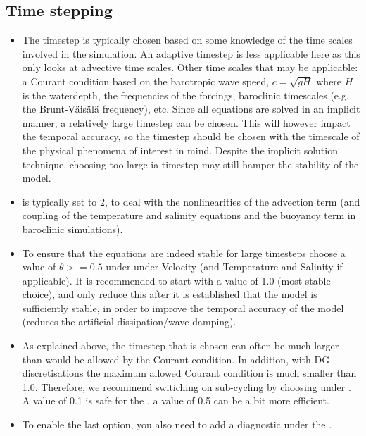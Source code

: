 \subsection{Time stepping}
\begin{itemize}
\item The timestep is typically chosen based on some knowledge of the time scales
  involved in the simulation. An adaptive timestep is less applicable here as
  this only looks at advective time scales. Other time scales that may be
  applicable: a Courant condition based on the barotropic wave speed, $c=\sqrt{gH}$ where
  $H$ is the waterdepth, the frequencies of the forcings, baroclinic timescales
  (e.g. the Brunt-V\"ais\"al\"a frequency), etc. Since all equations are solved in
  an implicit manner, a relatively large timestep can be chosen. This will
  however impact the temporal accuracy, so the timestep should be chosen with
  the timescale of the physical phenomena of interest in mind. Despite the
  implicit solution technique, choosing too large ia timestep may still hamper
  the stability of the model.
\item {} is typically set to 2, to
  deal with the nonlinearities of the advection term (and coupling of the
  temperature and salinity equations and the buoyancy term in baroclinic
  simulations).
\item To ensure that the equations are indeed stable for large timesteps choose
  a value of $\theta>=0.5$ under 
  under Velocity (and Temperature and Salinity if applicable). It is
  recommended to start with a value of 1.0 (most stable choice), and only
  reduce this after it is established that the model is sufficiently stable, in
  order to improve the temporal accuracy of the model (reduces the artificial 
  dissipation/wave damping).
\item As explained above, the timestep that is chosen can often be much larger
  than would be allowed by the Courant condition. In addition, with DG
  discretisations the maximum allowed Courant condition is much smaller than
  1.0. Therefore, we recommend switiching on sub-cycling by choosing
   under
  . A value of 0.1 is safe for the
  , a value of 0.5 can be a
  bit more efficient.
\item To enable the last option, you also need to add a
  diagnostic  under the
  .
\end{itemize}

